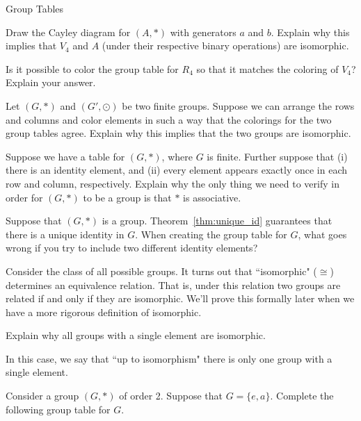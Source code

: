 \begin{section}{Group Tables}
\begin{exercise}
Draw the Cayley diagram for $(A,*)$ with generators $a$ and $b$.  Explain why this implies that $V_4$ and $A$ (under their respective binary operations) are isomorphic.  
\end{exercise}

\begin{exercise}
Is it possible to color the group table for $R_4$ so that it matches the coloring of $V_4$?  Explain your answer.
\end{exercise}

\begin{problem}\label{prob:iso_same_group_table}
Let $(G,*)$ and $(G',\odot)$ be two finite groups.  Suppose we can arrange the rows and columns and color elements in such a way that the colorings for the two group tables agree.  Explain why this implies that the two groups are isomorphic.
\end{problem}

\begin{problem}
Suppose we have a table for $(G,*)$, where $G$ is finite.  Further suppose that (i) there is an identity element, and (ii) every element appears exactly once in each row and column, respectively.  Explain why the only thing we need to verify in order for $(G,*)$ to be a group is that $*$ is associative.
\end{problem}

\begin{problem}%
Suppose that $(G,*)$ is a group.  Theorem~\ref{thm:unique_id} guarantees that there is a unique identity in $G$.  When creating the group table for $G$, what goes wrong if you try to include two different identity elements?
\end{problem}

Consider the class of all possible groups.  It turns out that ``isomorphic" ($\cong$) determines an equivalence relation.  That is, under this relation two groups are related if and only if they are isomorphic.  We'll prove this formally later when we have a more rigorous definition of isomorphic.

\begin{problem}
Explain why all groups with a single element are isomorphic.
\end{problem}

In this case, we say that ``up to isomorphism" there is only one group with a single element.

\begin{problem}
Consider a group $(G,*)$ of order 2.  Suppose that $G=\{e,a\}$.  Complete the following group table for $G$.


\end{problem}
\end{section}
